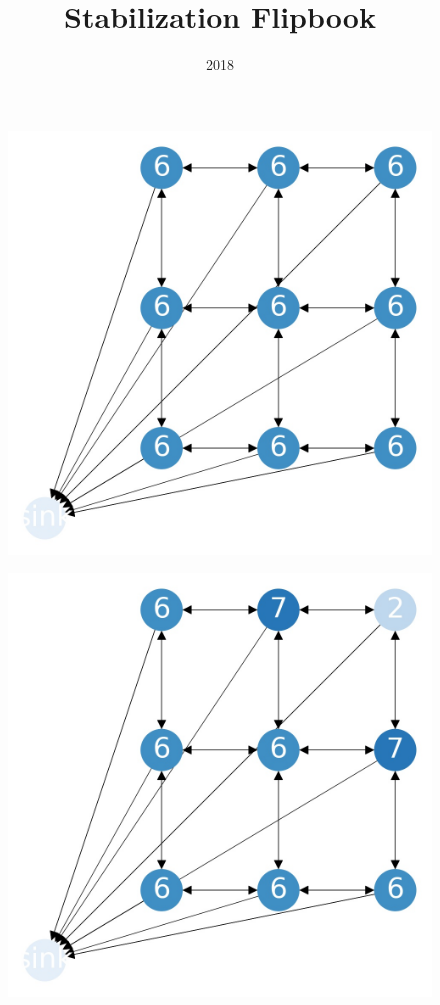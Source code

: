 \documentclass{beamer}
\title{Stabilization Flipbook}
\date{2018}
\begin{document}
    \frame{\titlepage}
    

    \begin{frame}
      \begin{figure}[h!]
        \centering
          \includegraphics[scale=0.25]{sandpile_0}
      \end{figure}
    \end{frame}
    

    \begin{frame}
      \begin{figure}[h!]
        \centering
          \includegraphics[scale=0.25]{sandpile_-1}
      \end{figure}
    \end{frame}
    
\end{document}
